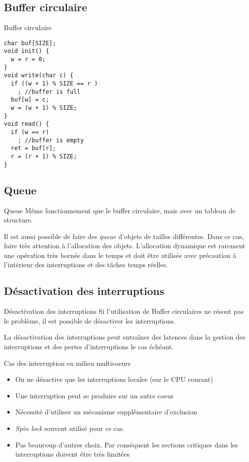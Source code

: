 \subsection{Buffer circulaire}

\begin{frame}[fragile]{Buffer circulaire}
  \begin{lstlisting}
char buf[SIZE];
void init() {
  w = r = 0;
}
void write(char c) {
  if ((w + 1) % SIZE == r )
    ; //buffer is full
  buf[w] = c;
  w = (w + 1) % SIZE;
}
void read() {
  if (w == r)
    ; //buffer is empty
  ret = buf[r];
  r = (r + 1) % SIZE;
}
  \end{lstlisting}
\end{frame}

\subsection{Queue}

\begin{frame}{Queue}
  Même fonctionnement  que le buffer circulaire, mais  avec un tableau
  de structure.

  Il est aussi possible de  faire des \emph{queue} d'objets de tailles
  différentes.  Dans  ce cas, faire très attention  à l'allocation des
  objets.   L'allocation  dynamique est  rarement  une opération  très
  bornée  dans  le temps  et  doit  être  utilisée avec  précaution  à
  l'intérieur des interruptions et des tâches temps réelles.
\end{frame}

\subsection{Désactivation des interruptions}

\begin{frame}{Désactivation des interruptions}
  Si l'utilisation de Buffer circulaires ne résout pas le problème, il
  est possible de désactiver les interruptions.

  La désactivation des interruptions peut entraîner des latences dans la
  gestion  des  interruptions  et  des  pertes  d'interruptions  le  cas
  échéant.
\end{frame}

\begin{frame}{Cas des interruption en milieu multicoeurs}
  \begin{itemize}
  \item  On ne  désactive que  les interruptions  locales (sur  le CPU
    courant)
  \item Une interruption peut se produire sur un autre coeur
  \item Nécessité d'utiliser un mécanisme supplémentaire d'exclusion
  \item \emph{Spin lock} souvent utilisé pour ce cas.
  \item  Pas beaucoup  d'autres  choix.  Par  conséquent les  sections
    critiques dans les interruptions doivent être très limitées
  \end{itemize}
\end{frame}

